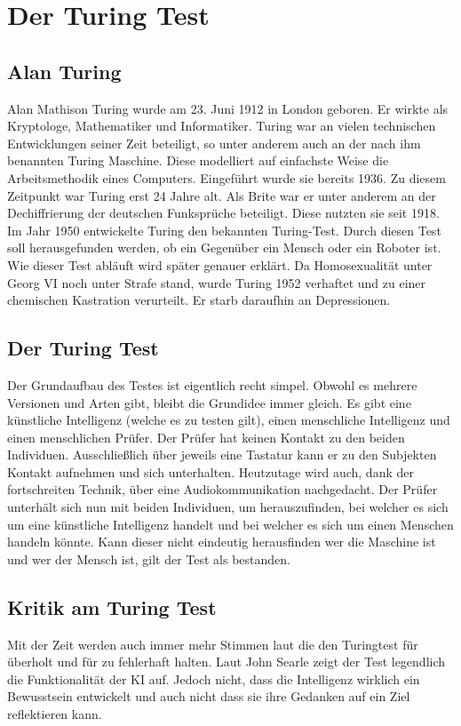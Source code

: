 \chapter{Der Turing Test}

\section{Alan Turing}
Alan Mathison Turing wurde am 23. Juni 1912 in London geboren. Er wirkte als Kryptologe, Mathematiker und Informatiker. Turing war an vielen technischen Entwicklungen seiner Zeit beteiligt, so unter anderem auch an der nach ihm benannten Turing Maschine. Diese modelliert auf einfachste Weise die Arbeitsmethodik eines Computers. Eingeführt wurde sie bereits 1936. Zu diesem Zeitpunkt war Turing erst 24 Jahre alt. Als Brite war er unter anderem an der Dechiffrierung der deutschen Funksprüche beteiligt. Diese nutzten sie seit 1918. Im Jahr 1950 entwickelte Turing den bekannten Turing-Test. Durch diesen Test soll herausgefunden werden, ob ein Gegenüber ein Mensch oder ein Roboter ist. Wie dieser Test abläuft wird später genauer erklärt. Da Homosexualität unter Georg VI noch unter Strafe stand, wurde Turing 1952 verhaftet und zu einer chemischen Kastration verurteilt. Er starb daraufhin an  Depressionen. ~\cite{Turing_Leben}

\section{Der Turing Test}
Der Grundaufbau des Testes ist eigentlich recht simpel. Obwohl es mehrere Versionen und Arten gibt, bleibt die Grundidee immer gleich. Es gibt eine künstliche Intelligenz (welche es zu testen gilt), einen menschliche Intelligenz und einen menschlichen Prüfer. Der Prüfer hat keinen Kontakt zu den beiden Individuen. Ausschließlich über jeweils eine Tastatur kann er zu den Subjekten Kontakt aufnehmen und sich unterhalten. Heutzutage wird auch, dank der fortschreiten Technik, über eine Audiokommunikation nachgedacht. Der Prüfer unterhält sich nun mit beiden Individuen, um herauszufinden, bei welcher es sich um eine künstliche Intelligenz handelt und bei welcher es sich um einen Menschen handeln könnte. Kann dieser nicht eindeutig herausfinden wer die Maschine ist und wer der Mensch ist, gilt der Test als bestanden. ~\cite{gregorlüdi/martinlüscher20077}

\section{Kritik am Turing Test}
Mit der Zeit werden auch immer mehr Stimmen laut die den Turingtest für überholt und für zu fehlerhaft halten. Laut John Searle zeigt der Test legendlich die Funktionalität der KI auf. Jedoch nicht, dass die Intelligenz wirklich ein Bewusstsein entwickelt und auch nicht dass sie ihre Gedanken auf ein Ziel reflektieren kann. ~\cite{jaai2019}

